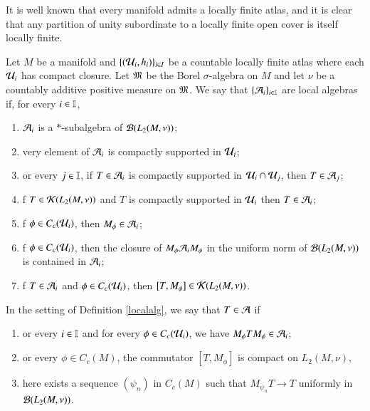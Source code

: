 \documentclass[leqno]{amsart}
\begin{document}
	It is well known that every manifold admits a locally finite atlas, and it is clear that any partition of unity subordinate to a locally finite open cover is itself locally finite.
	
	\begin{definition}\label{localalg}
		Let $M$ be a manifold and $\{({\mathcal U}_i, h_i)\}_{i\in I}$ be a countable locally finite atlas where each ${\mathcal U}_i$ has compact closure. Let $\mathfrak M$ be the Borel $\sigma$-algebra on $M$ and let $\nu$ be a countably additive positive measure on $\mathfrak M$. We say that $\{{\mathcal A}_i\}_{i\in\mathbb I}$ are local algebras if, for every $i\in\mathbb I$,
		\begin{enumerate}[\rm(1)]
			\item ${\mathcal A}_i$ is a $*$-subalgebra of ${\mathcal B}(L_2(M, \nu))$;
			\item {}very element of ${\mathcal A}_i$ is compactly supported in ${\mathcal U}_i$;
			\item {}or every $j\in\mathbb I$, if $T\in{\mathcal A}_i$ is compactly supported in ${\mathcal U}_i\cap{\mathcal U}_j$, then $T\in {\mathcal A}_j$;
			\item {}f $T\in{\mathcal K}(L_2(M, \nu))$ and $T$ is compactly supported in ${\mathcal U}_i$ then $T\in{\mathcal A}_i$;
			\item {}f $\phi\in C_c({\mathcal U}_i)$, then $M_\phi\in{\mathcal A}_i$;
			\item {}f $\phi\in C_c({\mathcal U}_i)$, then the closure of $M_\phi{\mathcal A}_i M_\phi$ in the uniform norm of ${\mathcal B}(L_{2}(M,\nu))$ is contained in ${\mathcal A}_i$;
			\item {}f $T\in{\mathcal A}_i$ and $\phi\in C_c({\mathcal U}_i)$, then $[T, M_\phi]\in {\mathcal K}(L_2(M, \nu))$.
		\end{enumerate}
	\end{definition}
	
	\begin{definition}\label{A}
		In the setting of Definition \ref{localalg}, we say that $T\in{\mathcal A}$ if
		\begin{enumerate}[\rm(1)]
			\item {}or every $i\in\mathbb I$ and for every $\phi\in C_c({\mathcal U}_i)$, we have $M_\phi T M_\phi\in {\mathcal A}_i$;
			\item {}or every $\phi\in C_{c}(M)$, the commutator $[T, M_\phi]$ is compact on $L_{2}(M,\nu)$, %
			\item {}here exists a sequence $(\psi_n)$ in $C_{c}(M)$ such that $M_{\psi_n}T\to T$ uniformly in ${\mathcal B}(L_{2}(M,\nu))$.
		\end{enumerate}
	\end{definition}
	
\end{document}
